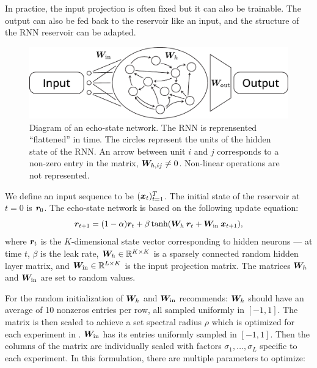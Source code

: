 In practice, the input projection is often fixed but it can also be trainable.
The output can also be fed back to the reservoir like an input, and the
structure of the \ac{RNN} reservoir can be adapted.

\begin{figure}[htbp]
  \centering
  \includegraphics[width=.8\linewidth]{figures/echo_state_network}
  \caption{Diagram of an echo-state network. The \ac{RNN} is reprensented
    ``flattened'' in time. The circles represent the units of the hidden state
    of the \ac{RNN}. An arrow between unit $i$ and $j$ corresponds to a non-zero
    entry in the matrix, ${\bm{W}}_{h, ij} \neq 0$. Non-linear operations are not
    represented.}
  \label{fig:echo_state_network}
\end{figure}

We define an input sequence to be $({\bm{x}}_{t})_{t=1}^{T}$. The initial state of
the reservoir at $t = 0$ is ${\bm{r}}_{0}$. The echo-state network is based on the
following update equation:
\begin{equation}
  \label{eq:esn}
  {\bm{r}}_{t + 1} = (1 - \alpha) {\bm{r}}_{t}
  +
  \beta \tanh({\bm{W}}_{h}\: {\bm{r}}_{t} + {\bm{W}}_{\text{in}}\: {\bm{x}}_{t + 1}),
\end{equation}
where ${\bm{r}}_{t}$ is the $K$-dimensional state vector corresponding to
hidden neurons --- at time $t$, $\beta$ is the leak rate,
${\bm{W}}_{h} \in \mathbb{R}^{K \times K}$ is a sparsely connected random hidden
layer matrix, and ${\bm{W}}_{\text{in}} \in \mathbb{R}^{L \times K}$ is the input
projection matrix. The matrices ${\bm{W}}_{h}$ and ${\bm{W}}_{\text{in}}$ are set to
random values.

For the random initialization of ${\bm{W}}_{h}$ and ${\bm{W}}_{\text{in}}$
\textcite{jaegerLongShortTermMemory2012} recommends: ${\bm{W}}_{h}$ should have an
average of 10 nonzeros entries per row, all sampled uniformly in $[-1, 1]$.
The matrix is then scaled to achieve a set spectral radius $\rho$ which is
optimized for each experiment in \parencite{jaegerLongShortTermMemory2012}.
${\bm{W}}_{\text{in}}$ has its entries uniformly sampled in $[-1, 1]$. Then the columns
of the matrix are individually scaled with factors
$\sigma_{1}, \ldots, \sigma_{L}$ specific to each experiment. In this
formulation, there are multiple parameters to optimize:

